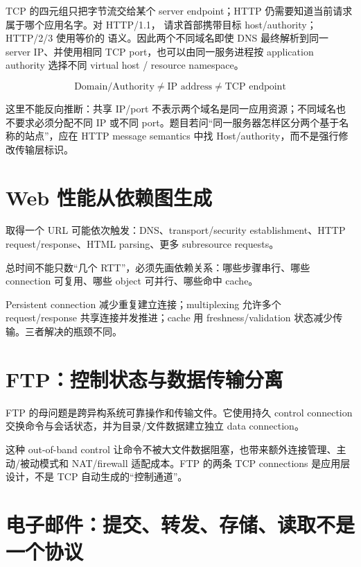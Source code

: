 \documentclass[UTF8,fontset=none,11pt,a4paper]{ctexart}
\begin{document}
TCP 的四元组只把字节流交给某个 server endpoint；HTTP 仍需要知道当前请求属于哪个应用名字。对 HTTP/1.1， 请求首部携带目标 host/authority；HTTP/2/3 使用等价的  语义。因此两个不同域名即使 DNS 最终解析到同一 server IP、并使用相同 TCP port，也可以由同一服务进程按 application authority 选择不同 virtual host / resource namespace。

\[
\boxed{\text{Domain/Authority}\neq\text{IP address}\neq\text{TCP endpoint}}
\]

这里不能反向推断：共享 IP/port 不表示两个域名是同一应用资源；不同域名也不要求必须分配不同 IP 或不同 port。题目若问“同一服务器怎样区分两个基于名称的站点”，应在 HTTP message semantics 中找 Host/authority，而不是强行修改传输层标识。

\section{Web
性能从依赖图生成}\label{5-web-ux6027ux80fdux4eceux4f9dux8d56ux56feux751fux6210}

取得一个 URL 可能依次触发：DNS、transport/security establishment、HTTP
request/response、HTML parsing、更多 subresource requests。

总时间不能只数``几个 RTT''，必须先画依赖关系：哪些步骤串行、哪些
connection 可复用、哪些 object 可并行、哪些命中 cache。

Persistent connection 减少重复建立连接；multiplexing 允许多个
request/response 共享连接并发推进；cache 用 freshness/validation
状态减少传输。三者解决的瓶颈不同。

\section{FTP：控制状态与数据传输分离}\label{6-ftpux63a7ux5236ux72b6ux6001ux4e0eux6570ux636eux4f20ux8f93ux5206ux79bb}

FTP 的母问题是跨异构系统可靠操作和传输文件。它使用持久 control
connection 交换命令与会话状态，并为目录/文件数据建立独立 data
connection。

这种 out-of-band control
让命令不被大文件数据阻塞，也带来额外连接管理、主动/被动模式和
NAT/firewall 适配成本。FTP 的两条 TCP connections 是应用层设计，不是 TCP
自动生成的``控制通道''。

\section{电子邮件：提交、转发、存储、读取不是一个协议}\label{7-ux7535ux5b50ux90aeux4ef6ux63d0ux4ea4ux8f6cux53d1ux5b58ux50a8ux8bfbux53d6ux4e0dux662fux4e00ux4e2aux534fux8bae}
\end{document}
